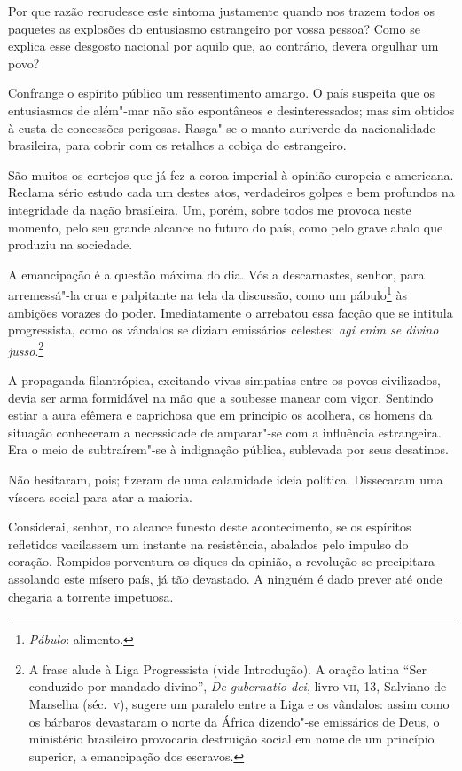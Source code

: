 Por que razão recrudesce este sintoma justamente quando nos trazem todos
os paquetes as explosões do entusiasmo estrangeiro por vossa pessoa?
Como se explica esse desgosto nacional por aquilo que, ao contrário,
devera orgulhar um povo?

Confrange o espírito público um ressentimento amargo. O país suspeita
que os entusiasmos de além"-mar não são espontâneos e desinteressados;
mas sim obtidos à custa de concessões perigosas. Rasga"-se o manto
auriverde da nacionalidade brasileira, para cobrir com os retalhos a
cobiça do estrangeiro.

São muitos os cortejos que já fez a coroa imperial à opinião europeia e
americana. Reclama sério estudo cada um destes atos, verdadeiros golpes
e bem profundos na integridade da nação brasileira. Um, porém, sobre
todos me provoca neste momento, pelo seu grande alcance no futuro do
país, como pelo grave abalo que produziu na sociedade.

A emancipação é a questão máxima do dia. Vós a descarnastes, senhor,
para arremessá"-la crua e palpitante na tela da discussão, como um
pábulo\footnote{ \textit{Pábulo}: alimento.} às ambições vorazes do poder. Imediatamente o arrebatou essa facção que
se intitula progressista, como os vândalos se diziam emissários celestes: \textit{agi enim se
divino jusso}.\footnote{ A frase alude à Liga Progressista (vide Introdução). 
A oração latina ``Ser conduzido por mandado divino'', \textit{De gubernatio dei}, livro \textsc{vii}, 13, Salviano 
de Marselha (séc.~\textsc{v}), sugere um paralelo entre a Liga e os vândalos: assim como os bárbaros devastaram 
o norte da África dizendo"-se emissários de Deus, o ministério brasileiro provocaria destruição social 
em nome de um princípio superior, a emancipação dos escravos.} 

A propaganda filantrópica, excitando vivas simpatias entre os povos
civilizados, devia ser arma formidável na mão que a soubesse manear com
vigor. Sentindo estiar a aura efêmera e caprichosa que em princípio os
acolhera, os homens da situação conheceram a necessidade de
amparar"-se com a influência estrangeira. Era o meio de
subtraírem"-se à indignação pública, sublevada por seus desatinos.

Não hesitaram, pois; fizeram de uma calamidade ideia política.
Dissecaram uma víscera social para atar a maioria. 

Considerai, senhor, no alcance funesto deste acontecimento, se os
espíritos refletidos vacilassem um instante na resistência, abalados
pelo impulso do coração. Rompidos porventura os diques da opinião, a
revolução se precipitara assolando este mísero país, já tão devastado.
A ninguém é dado prever até onde chegaria a torrente impetuosa. 

